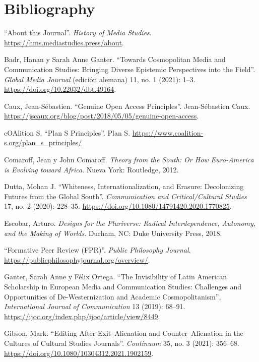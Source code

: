 \documentclass{tufte-handout}
\begin{document}
\section{Bibliography}\label{bibliography}

\begin{hangparas}{.25in}{1} 



``About this Journal''. \emph{History of Media Studies}.
\url{https://hms.mediastudies.press/about}.

Badr, Hanan y Sarah Anne Ganter. ``Towards Cosmopolitan Media and
Communication Studies: Bringing Diverse Epistemic Perspectives into the
Field''. \emph{Global Media Journal} (edición alemana) 11, no. 1 (2021):
1--3. \url{https://doi.org/10.22032/dbt.49164}.

Caux, Jean-Sébastien. ``Genuine Open Access Principles''. Jean-Sébastien
Caux.
\href{https://jscaux.org/blog/post/2018/05/05/genuine-open-access/}{https://jscaux.org/blog/post/2018/05/05/genuine-open-access}.

cOAlition S. ``Plan S Principles''. Plan S.
\url{https://www.coalition-s.org/plan_s_principles/}

Comaroff, Jean y John Comaroff. \emph{Theory from the South: Or How
Euro-America is Evolving toward Africa}. Nueva York: Routledge, 2012.

Dutta, Mohan J. ``Whiteness, Internationalization, and Erasure:
Decolonizing Futures from the Global South''. \emph{Communication and
Critical/Cultural Studies} 17, no. 2 (2020): 228--35.
\url{https://doi.org/10.1080/14791420.2020.1770825}.

Escobar, Arturo. \emph{Designs for the Pluriverse: Radical
Interdependence, Autonomy, and the Making of Worlds}. Durham, NC: Duke
University Press, 2018.

``Formative Peer Review (FPR)''. \emph{Public Philosophy Journal}.
\url{https://publicphilosophyjournal.org/overview/}.

Ganter, Sarah Anne y Félix Ortega. ``The Invisibility of Latin American
Scholarship in European Media and Communication Studies: Challenges and
Opportunities of De-Westernization and Academic Cosmopolitanism'',
\emph{International Journal of Communication} 13 (2019): 68--91.
\url{https://ijoc.org/index.php/ijoc/article/view/8449}.

Gibson, Mark. ``Editing After Exit--Alienation and Counter--Alienation
in the Cultures of Cultural Studies Journals''. \emph{Continuum} 35, no.
3 (2021): 356--68. \url{https://doi.org/10.1080/10304312.2021.1902159}.


\end{hangparas}
\end{document}
